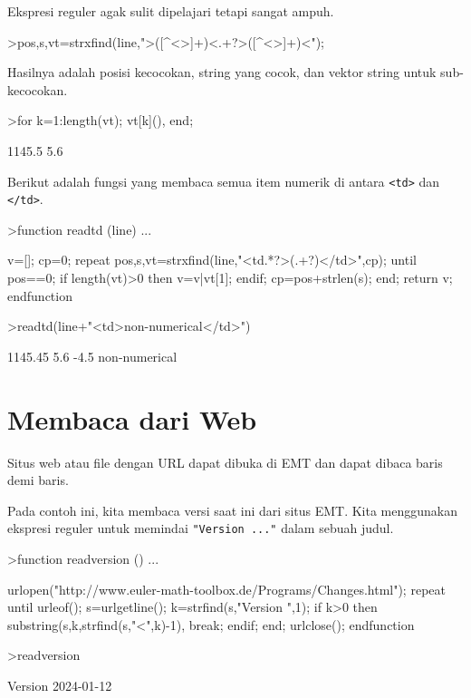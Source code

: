 \documentclass[a4paper,11pt,oneside,enabledeprecatedfontcommands]{scrbook}
\newenvironment{eulernotebook}{}{}
\newcommand{\eulerheading}[1]{\chapter{#1}}
\newenvironment{eulercomment}{\par\medskip\noindent}{\par\medskip}
\begin{document}
\begin{eulernotebook}
\begin{eulercomment}
			Ekspresi reguler agak sulit dipelajari tetapi sangat ampuh.
		\end{eulercomment}
		\begin{eulerprompt}
			>{pos,s,vt}=strxfind(line,">([^<>]+)<.+?>([^<>]+)<");
		\end{eulerprompt}
		\begin{eulercomment}
			Hasilnya adalah posisi kecocokan, string yang cocok, dan vektor string untuk sub-kecocokan.
		\end{eulercomment}
		\begin{eulerprompt}
			>for k=1:length(vt); vt[k](), end;
		\end{eulerprompt}
		\begin{euleroutput}
			1145.5
			5.6
		\end{euleroutput}
		\begin{eulercomment}
			Berikut adalah fungsi yang membaca semua item numerik di antara \texttt{<td>} dan \texttt{</td>}.
		\end{eulercomment}
		\begin{eulerprompt}
			>function readtd (line) ...
		\end{eulerprompt}
		\begin{eulerudf}
			v=[]; cp=0;
			repeat
			   {pos,s,vt}=strxfind(line,"<td.*?>(.+?)</td>",cp);
			   until pos==0;
			   if length(vt)>0 then v=v|vt[1]; endif;
			   cp=pos+strlen(s);
			end;
			return v;
			endfunction
		\end{eulerudf}
		\begin{eulerprompt}
			>readtd(line+"<td>non-numerical</td>")
		\end{eulerprompt}
		\begin{euleroutput}
			1145.45
			5.6
			-4.5
			non-numerical
		\end{euleroutput}
		
		\eulerheading{Membaca dari Web}
		\begin{eulercomment}
			Situs web atau file dengan URL dapat dibuka di EMT dan dapat dibaca baris demi baris.
			
			Pada contoh ini, kita membaca versi saat ini dari situs EMT. Kita menggunakan ekspresi reguler untuk
			memindai \texttt{"Version ..."} dalam sebuah judul.
		\end{eulercomment}
		\begin{eulerprompt}
			>function readversion () ...
		\end{eulerprompt}
		\begin{eulerudf}
			urlopen("http://www.euler-math-toolbox.de/Programs/Changes.html");
			repeat
			  until urleof();
			  s=urlgetline();
			  k=strfind(s,"Version ",1);
			  if k>0 then substring(s,k,strfind(s,"<",k)-1), break; endif;
			end;
			urlclose();
			endfunction
		\end{eulerudf}
		\begin{eulerprompt}
			>readversion
		\end{eulerprompt}
		\begin{euleroutput}
			Version 2024-01-12
		\end{euleroutput}
		

\end{eulernotebook}
\end{document}
